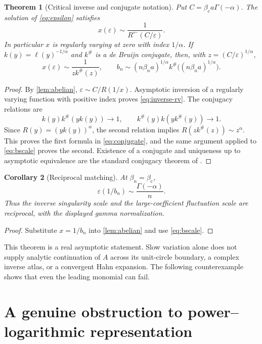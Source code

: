 \documentclass[11pt,a4paper]{article}
\numberwithin{equation}{section}
\newtheorem{theorem}{Theorem}[section]
\newtheorem{corollary}[theorem]{Corollary}
\theoremstyle{definition}\newtheorem{definition}[theorem]{Definition}
\theoremstyle{remark}\newtheorem{remark}[theorem]{Remark}
\theoremstyle{definition}
\newcommand{\bc}{\beta_{\mathrm c}}\newcommand{\rhoc}{\rho_{\mathrm c}}
\newcommand{\asyminv}{\leftarrow}
\begin{document}
\begin{theorem}[Critical inverse and conjugate notation]\label{thm:rv-inverse}
Put $C=\bc a\Gamma(-\alpha)$. The solution of \eqref{eq:epsilon} satisfies
\begin{equation}\label{eq:inverse-rv}
 \boxed{\quad x(\varepsilon)\sim
 \frac1{R^\asyminv(C/\varepsilon)}.\quad}
\end{equation}
In particular $x$ is regularly varying at zero with index $1/\alpha$.
If $k(y)=\ell(y)^{-1/\alpha}$ and $k^\#$ is a de Bruijn conjugate, then,
with $z=(C/\varepsilon)^{1/\alpha}$,
\begin{equation}\label{eq:conjugate}
 x(\varepsilon)\sim\frac1{z k^\#(z)},\qquad
 b_n\sim(n\beta_n a)^{1/\alpha}
 k^\#\bigl((n\beta_n a)^{1/\alpha}\bigr).
\end{equation}
\end{theorem}
\begin{proof}
By \cref{lem:abelian}, $\varepsilon\sim C/R(1/x)$. Asymptotic inversion
of a regularly varying function with positive index proves
\eqref{eq:inverse-rv}. The conjugacy relations are
\[
 k(y)k^\#(yk(y))\to1,\qquad
 k^\#(y)k(yk^\#(y))\to1.
\]
Since $R(y)=(yk(y))^\alpha$, the second relation implies
$R(zk^\#(z))\sim z^\alpha$. This proves the first formula in
\eqref{eq:conjugate}, and the same argument applied to \eqref{eq:bscale}
proves the second. Existence of a conjugate and uniqueness up to asymptotic
equivalence are the standard conjugacy theorem of \cite{bgt}.
\end{proof}

\begin{corollary}[Reciprocal matching]\label{cor:reciprocal}
At $\beta_n=\bc$,
\[
 \varepsilon(1/b_n)\sim\frac{\Gamma(-\alpha)}n.
\]
Thus the inverse singularity scale and the large-coefficient fluctuation
scale are reciprocal, with the displayed gamma normalization.
\end{corollary}
\begin{proof}
Substitute $x=1/b_n$ into \cref{lem:abelian} and use \eqref{eq:bscale}.
\end{proof}

This theorem is a real asymptotic statement. Slow variation alone does not
supply analytic continuation of $A$ across its unit-circle boundary, a
complex inverse atlas, or a convergent Hahn expansion. The following
counterexample shows that even the leading monomial can fail.

\section{A genuine obstruction to power--logarithmic representation}
\label{sec:obstruction}
\end{document}
